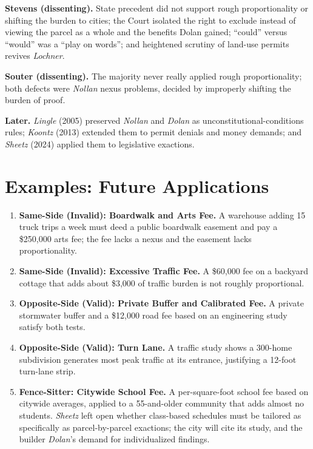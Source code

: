 \documentclass[12pt]{article}
\begin{document}
\textbf{Stevens (dissenting).} State precedent did not support rough proportionality or shifting the burden to cities; the Court isolated the right to exclude instead of viewing the parcel as a whole and the benefits Dolan gained; ``could'' versus ``would'' was a ``play on words''; and heightened scrutiny of land-use permits revives \textit{Lochner}.

\textbf{Souter (dissenting).} The majority never really applied rough proportionality; both defects were \textit{Nollan} nexus problems, decided by improperly shifting the burden of proof.

\textbf{Later.} \textit{Lingle} (2005) preserved \textit{Nollan} and \textit{Dolan} as unconstitutional-conditions rules; \textit{Koontz} (2013) extended them to permit denials and money demands; and \textit{Sheetz} (2024) applied them to legislative exactions.

\section{Examples: Future Applications}

\begin{enumerate}
\item \textbf{Same-Side (Invalid): Boardwalk and Arts Fee.} A warehouse adding 15 truck trips a week must deed a public boardwalk easement and pay a \$250,000 arts fee; the fee lacks a nexus and the easement lacks proportionality.
\item \textbf{Same-Side (Invalid): Excessive Traffic Fee.} A \$60,000 fee on a backyard cottage that adds about \$3,000 of traffic burden is not roughly proportional.
\item \textbf{Opposite-Side (Valid): Private Buffer and Calibrated Fee.} A private stormwater buffer and a \$12,000 road fee based on an engineering study satisfy both tests.
\item \textbf{Opposite-Side (Valid): Turn Lane.} A traffic study shows a 300-home subdivision generates most peak traffic at its entrance, justifying a 12-foot turn-lane strip.
\item \textbf{Fence-Sitter: Citywide School Fee.} A per-square-foot school fee based on citywide averages, applied to a 55-and-older community that adds almost no students. \textit{Sheetz} left open whether class-based schedules must be tailored as specifically as parcel-by-parcel exactions; the city will cite its study, and the builder \textit{Dolan}'s demand for individualized findings.
\end{enumerate}
\end{document}
